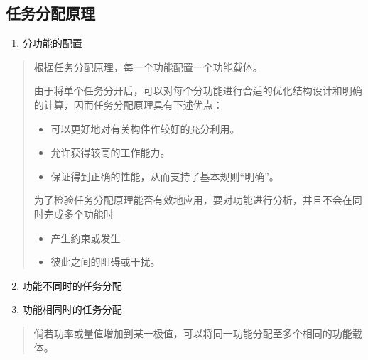 \documentclass[letterpaper,10pt,english]{sphinxmanual}
\begin{document}
\subsection{任务分配原理}
\label{unit6:id10}\begin{enumerate}
\item {} 
分功能的配置

\end{enumerate}
\begin{quote}

根据任务分配原理，每一个功能配置一个功能载体。

由于将单个任务分开后，可以对每个分功能进行合适的优化结构设计和明确的计算，因而任务分配原理具有下述优点：
\begin{itemize}
\item {} 
可以更好地对有关构件作较好的充分利用。

\item {} 
允许获得较高的工作能力。

\item {} 
保证得到正确的性能，从而支持了基本规则“明确”。

\end{itemize}

为了检验任务分配原理能否有效地应用，要对功能进行分析，并且不会在同时完成多个功能时
\begin{itemize}
\item {} 
产生约束或发生

\item {} 
彼此之间的阻碍或干扰。

\end{itemize}
\end{quote}
\begin{enumerate}
\setcounter{enumi}{1}
\item {} 
功能不同时的任务分配

\item {} 
功能相同时的任务分配

\end{enumerate}
\begin{quote}

倘若功率或量值增加到某一极值，可以将同一功能分配至多个相同的功能载体。
\end{quote}
\end{document}
